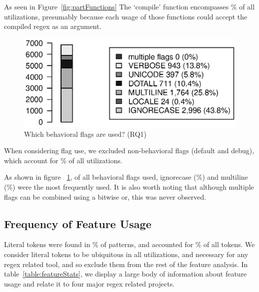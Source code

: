 As seen in Figure~\ref{fig:partFunctions} The `compile' function encompasses \% of all utilizations, presumably because each usage of those functions could accept the compiled regex as an argument.

\begin{figure}[tb]
\centering
\includegraphics[width=\columnwidth]{../analysis_output/partFlags.eps}
\caption{Which behavioral flags are used? (RQ1)}
\label{fig:partFlags}
\end{figure}

When considering flag use, we excluded non-behavioral flags (default and debug), which account for \% of all utilizations.

 As shown in figure ~\ref{fig:partFlags}, of all behavioral flags used, ignorecase (\%) and multiline (\%) were the most frequently used.  It is also worth noting that although multiple flags can be combined using a bitwise or, this was never observed.


% 

\subsection{Frequency of Feature Usage}

Literal tokens were found in \% of patterns, and accounted for \% of all tokens.  We consider literal tokens to be ubiquitous in all utilizations, and necessary for any regex related tool, and so exclude them from the rest of the feature analysis.  In table~\ref{table:featureStats}, we display a large body of information about feature usage and relate it to four major regex related projects.

